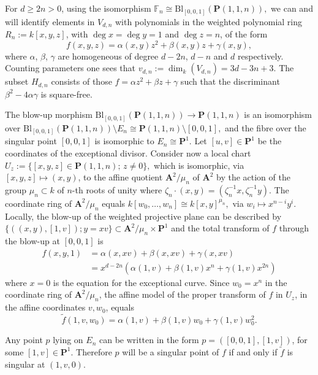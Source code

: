 \documentclass[10pt,a4paper,twoside]{amsart}
\theoremstyle{plain}
\theoremstyle{definition}
\theoremstyle{remark}
\begin{document}
For $d \geq 2n > 0$, using the isomorphism $\mathbb{F}_n\cong \mathrm{Bl}_{\left[0,0,1\right]} (\mathbf{P}(1,1,n)),$ we can and will identify elements in $V_{d,n}$ with polynomials in the weighted polynomial ring $R_n:=k\left[x,y,z\right]$, with $\operatorname{deg}x=\operatorname{deg}y=1$ and $\operatorname{deg}z=n$, of the form 
$$
f(x,y,z)=\alpha(x,y) z^2+\beta(x,y) z+\gamma(x,y),
$$
where $\alpha$, $\beta$, $\gamma$ are homogeneous of degree $d-2n$, $d-n$ and $d$ respectively.  
Counting parameters one sees that $v_{d,n}:=\operatorname{dim}_k(V_{d,n})=3d-3n+3$. The subset $H_{d,n}$ consists of those $f=\alpha z^2+\beta z+\gamma$ such that the discriminant $\beta^2-4\alpha \gamma$ is square-free. 

The blow-up morphism $\mathrm{Bl}_{\left[0,0,1\right]} (\mathbf{P}(1,1,n))\rightarrow \mathbf{P}(1,1,n)$ is an isomorphism over $\mathrm{Bl}_{\left[0,0,1\right]} (\mathbf{P}(1,1,n))\setminus E_n \cong \mathbf{P}(1,1,n)\setminus [0,0,1],$ and the fibre over the singular point $[0,0,1]$ is isomorphic to $E_n\cong\mathbf{P}^1$. Let $[u,v]\in \mathbf{P}^1$ be the coordinates of the exceptional divisor.
Consider now a local chart $U_z:=\{\left[x,y,z\right]\in \mathbf{P}(1,1,n);\,z\neq 0\},$ which is isomorphic, via $[x,y,z] \mapsto (x,y)$, to the affine quotient $\mathbf{A}^2/\mu_n$ of $\mathbf{A}^2$ by the action of the group $\mu_n \subset k$ of $n\mbox{-}$th roots of unity where $\zeta_n \cdot(x,y)=(\zeta_n^{-1}x,\zeta_n^{-1}y)$.  
The coordinate ring of $\mathbf{A}^2/\mu_n$ equals $k[w_0,\dots,w_{n}]\cong k[x,y]^{\mu_n},$ via $w_i\mapsto x^{n-i}y^i.$
Locally, the blow-up of the weighted projective plane can be described by $\{((x,y),\left[1,v\right]); y=xv\} \subset \mathbf{A}^2/\mu_n \times \mathbf{P}^1$ and the total transform of $f$ through the blow-up at $[0,0,1]$ is
\begin{align*}
f(x,y,1)&=\alpha(x,xv)+\beta(x,xv)+\gamma(x,xv)\\
&=x^{d-2n}\left(\alpha(1,v)+\beta(1,v)x^n+\gamma(1,v)x^{2n}\right)
\end{align*}
where $x=0$ is the equation for the exceptional curve.
Since $w_0=x^n$ in the coordinate ring of $\mathbf{A}^2/\mu_n$, the affine model of the proper transform of $f$ in $U_z$, in the affine coordinates $v,w_0$, equals
\begin{equation}\label{f_strict}
\tilde{f}(1,v,w_0)=\alpha(1,v)+\beta(1,v)w_0+\gamma(1,v)w_0^{2}.
\end{equation}

Any point $p$ lying on $E_n$ can be written in the form $p=(\left[0,0,1\right],\left[1,v\right])$, for some $\left[1,v\right]\in\mathbf{P}^1.$
Therefore $p$ will be a singular point of $f$ if and only if $\tilde{f}$ is singular at $(1,v,0)$.
\end{document}

